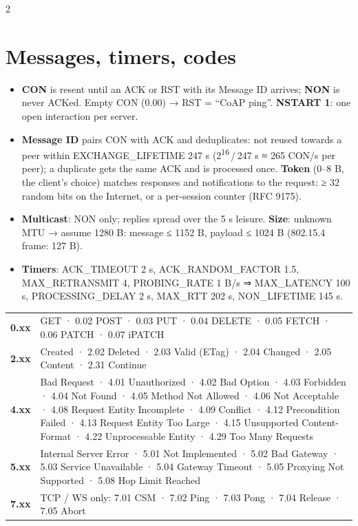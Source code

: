 \documentclass[8pt]{extarticle}
\begin{document}
\begin{multicols}{2}
\raggedright
\footnotesize{}

\section{Messages, timers, codes}
\begin{itemize}
  \item \textbf{CON} is resent until an ACK or RST with its Message ID arrives; \textbf{NON} is
        never ACKed. Empty CON (0.00) → RST = ``CoAP ping''. \textbf{NSTART 1}: one open
        interaction per server.
  \item \textbf{Message ID} pairs CON with ACK and deduplicates: not reused towards a peer within
        EXCHANGE\_LIFETIME 247 s (2\textsuperscript{16}\,/\,247 s ≈ 265 CON/s per peer); a duplicate
        gets the same ACK and is processed once. \textbf{Token} (0–8 B, the client's choice)
        matches responses and notifications to the request: ≥ 32 random bits on the Internet, or a
        per-session counter (RFC 9175).
  \item \textbf{Multicast}: NON only; replies spread over the 5 s leisure. \textbf{Size}: unknown
        MTU → assume 1280 B: message ≤ 1152 B, payload ≤ 1024 B (802.15.4 frame: 127 B).
  \item \textbf{Timers}: ACK\_TIMEOUT 2 s, ACK\_RANDOM\_FACTOR 1.5, MAX\_RETRANSMIT 4, PROBING\_RATE
        1 B/s ⇒ MAX\_LATENCY 100 s, PROCESSING\_DELAY 2 s, MAX\_RTT 202 s, NON\_LIFETIME 145 s.
\end{itemize}
{\scriptsize\setlength{\tabcolsep}{2pt}
\begin{tabular}{@{}>{\bfseries}l>{\raggedright\arraybackslash}p{72mm}@{}}
0.xx & 0.01 GET · 0.02 POST · 0.03 PUT · 0.04 DELETE · 0.05 FETCH · 0.06 PATCH · 0.07 iPATCH\\
2.xx & 2.01 Created · 2.02 Deleted · 2.03 Valid (ETag) · 2.04 Changed · 2.05 Content · 2.31 Continue\\
4.xx & 4.00 Bad Request · 4.01 Unauthorized · 4.02 Bad Option · 4.03 Forbidden · 4.04 Not Found ·
       4.05 Method Not Allowed · 4.06 Not Acceptable · 4.08 Request Entity Incomplete · 4.09 Conflict ·
       4.12 Precondition Failed · 4.13 Request Entity Too Large · 4.15 Unsupported Content-Format ·
       4.22 Unprocessable Entity · 4.29 Too Many Requests\\
5.xx & 5.00 Internal Server Error · 5.01 Not Implemented · 5.02 Bad Gateway · 5.03 Service
       Unavailable · 5.04 Gateway Timeout · 5.05 Proxying Not Supported · 5.08 Hop Limit Reached\\
7.xx & TCP / WS only: 7.01 CSM · 7.02 Ping · 7.03 Pong · 7.04 Release · 7.05 Abort\\
\end{tabular}}


\end{multicols}
\end{document}
